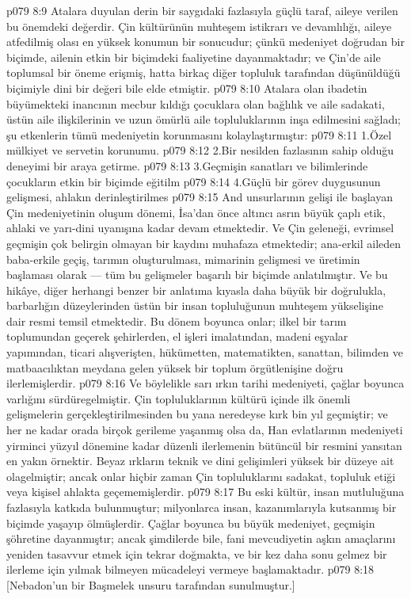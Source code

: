 \vs p079 8:9 Atalara duyulan derin bir saygıdaki fazlasıyla güçlü taraf, aileye verilen bu önemdeki değerdir. Çin kültürünün muhteşem istikrarı ve devamlılığı, aileye atfedilmiş olası en yüksek konumun bir sonucudur; çünkü medeniyet doğrudan bir biçimde, ailenin etkin bir biçimdeki faaliyetine dayanmaktadır; ve Çin’de aile toplumsal bir öneme erişmiş, hatta birkaç diğer topluluk tarafından düşünüldüğü biçimiyle dini bir değeri bile elde etmiştir.
\vs p079 8:10 Atalara olan ibadetin büyümekteki inancının mecbur kıldığı çocuklara olan bağlılık ve aile sadakati, üstün aile ilişkilerinin ve uzun ömürlü aile topluluklarının inşa edilmesini sağladı; şu etkenlerin tümü medeniyetin korunmasını kolaylaştırmıştır:
\vs p079 8:11 1.\bibnobreakspace Özel mülkiyet ve servetin korunumu.
\vs p079 8:12 2.\bibnobreakspace Bir nesilden fazlasının sahip olduğu deneyimi bir araya getirme.
\vs p079 8:13 3.\bibnobreakspace Geçmişin sanatları ve bilimlerinde çocukların etkin bir biçimde eğitilm
\vs p079 8:14 4.\bibnobreakspace Güçlü bir görev duygusunun gelişmesi, ahlakın derinleştirilmes
\vs p079 8:15 And unsurlarının gelişi ile başlayan Çin medeniyetinin oluşum dönemi, İsa’dan önce altıncı asrın büyük çaplı etik, ahlaki ve yarı\hyp{}dini uyanışına kadar devam etmektedir. Ve Çin geleneği, evrimsel geçmişin çok belirgin olmayan bir kaydını muhafaza etmektedir; ana\hyp{}erkil aileden baba\hyp{}erkile geçiş, tarımın oluşturulması, mimarinin gelişmesi ve üretimin başlaması olarak --- tüm bu gelişmeler başarılı bir biçimde anlatılmıştır. Ve bu hikâye, diğer herhangi benzer bir anlatıma kıyasla daha büyük bir doğrulukla, barbarlığın düzeylerinden üstün bir insan topluluğunun muhteşem yükselişine dair resmi temsil etmektedir. Bu dönem boyunca onlar; ilkel bir tarım toplumundan geçerek şehirlerden, el işleri imalatından, madeni eşyalar yapımından, ticari alışverişten, hükümetten, matematikten, sanattan, bilimden ve matbaacılıktan meydana gelen yüksek bir toplum örgütlenişine doğru ilerlemişlerdir.
\vs p079 8:16 Ve böylelikle sarı ırkın tarihi medeniyeti, çağlar boyunca varlığını sürdüregelmiştir. Çin topluluklarının kültürü içinde ilk önemli gelişmelerin gerçekleştirilmesinden bu yana neredeyse kırk bin yıl geçmiştir; ve her ne kadar orada birçok gerileme yaşanmış olsa da, Han evlatlarının medeniyeti yirminci yüzyıl dönemine kadar düzenli ilerlemenin bütüncül bir resmini yansıtan en yakın örnektir. Beyaz ırkların teknik ve dini gelişimleri yüksek bir düzeye ait olagelmiştir; ancak onlar hiçbir zaman Çin topluluklarını sadakat, topluluk etiği veya kişisel ahlakta geçememişlerdir.
\vs p079 8:17 Bu eski kültür, insan mutluluğuna fazlasıyla katkıda bulunmuştur; milyonlarca insan, kazanımlarıyla kutsanmış bir biçimde yaşayıp ölmüşlerdir. Çağlar boyunca bu büyük medeniyet, geçmişin şöhretine dayanmıştır; ancak şimdilerde bile, fani mevcudiyetin aşkın amaçlarını yeniden tasavvur etmek için tekrar doğmakta, ve bir kez daha sonu gelmez bir ilerleme için yılmak bilmeyen mücadeleyi vermeye başlamaktadır.
\vs p079 8:18 [Nebadon’un bir Başmelek unsuru tarafından sunulmuştur.]
